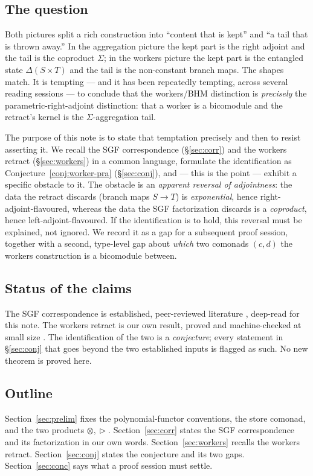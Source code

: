 \documentclass[11pt]{amsart}
\theoremstyle{plain}
\theoremstyle{definition}
\theoremstyle{gap}
\renewcommand{\lhd}{\vartriangleright}
\newcommand{\Store}[1]{\Delta #1}
\begin{document}
\subsection*{The question}
Both pictures split a rich construction into ``content that is kept'' and ``a tail
that is thrown away.'' In the aggregation picture the kept part is the right adjoint
and the tail is the coproduct $\Sigma$; in the workers picture the kept part is the
entangled state $\Store{(S\times T)}$ and the tail is the non-constant branch maps.
The shapes match. It is tempting --- and it has been repeatedly tempting, across
several reading sessions --- to conclude that the workers/BHM distinction is
\emph{precisely} the parametric-right-adjoint distinction: that a worker is a
bicomodule and the retract's kernel is the $\Sigma$-aggregation tail.

The purpose of this note is to state that temptation precisely and then to resist
asserting it. We recall the SGF correspondence (\S\ref{sec:corr}) and the workers
retract (\S\ref{sec:workers}) in a common language, formulate the identification as
Conjecture~\ref{conj:worker-pra} (\S\ref{sec:conj}), and --- this is the point ---
exhibit a specific obstacle to it. The obstacle is an \emph{apparent reversal of
adjointness}: the data the retract discards (branch maps $S\to T$) is
\emph{exponential}, hence right-adjoint-flavoured, whereas the data the SGF
factorization discards is a \emph{coproduct}, hence left-adjoint-flavoured. If the
identification is to hold, this reversal must be explained, not ignored. We record it
as a gap for a subsequent proof session, together with a second, type-level gap about
\emph{which} two comonads $(c,d)$ the workers construction is a bicomodule between.

\subsection*{Status of the claims}
The SGF correspondence is established, peer-reviewed literature
\cite{SGF}, deep-read for this note. The workers retract is our own result, proved
and machine-checked at small size \cite{workersProof}. The identification of the two
is a \emph{conjecture}; every statement in \S\ref{sec:conj} that goes beyond the two
established inputs is flagged as such. No new theorem is proved here.

\subsection*{Outline}
Section~\ref{sec:prelim} fixes the polynomial-functor conventions, the store comonad,
and the two products $\otimes,\lhd$. Section~\ref{sec:corr} states the SGF
correspondence and its factorization in our own words. Section~\ref{sec:workers}
recalls the workers retract. Section~\ref{sec:conj} states the conjecture and its two
gaps. Section~\ref{sec:conc} says what a proof session must settle.
\end{document}
